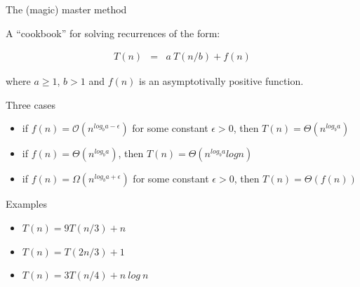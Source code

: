 \begin{frame}{The (magic) master method}

  A ``cookbook'' for solving recurrences of the form:

  \begin{eqnarray*}
    T(n) & = & a\ T(n/b) + f(n)
  \end{eqnarray*}

   where $a \geq 1$, $b > 1$ and $f(n)$ is an asymptotivally positive function.

   \begin{block}{Three cases}
     \begin{scriptsize}
     \begin{itemize}
      \item if $f(n) = \mathcal{O}(n^{log_b a-\epsilon})$ for some constant $\epsilon > 0$\pause, then $T(n) = \Theta(n^{log_b a})$ \pause
      \item if $f(n) = \Theta(n^{log_b a})$\pause, then $T(n) = \Theta(n^{log_b a} log n)$\pause
      \item if $f(n) = \Omega(n^{log_b a + \epsilon})$ for some constant $\epsilon > 0$\pause, then $T(n) = \Theta(f(n))$ 
     \end{itemize}
     \end{scriptsize}
   \end{block}  
  
\end{frame}

\begin{frame}{Examples}

  \begin{itemize}
    \item $T(n) = 9T(n/3) + n$
    \item $T(n) = T(2n/3) + 1$
    \item $T(n) = 3T(n/4) + n\ log\ n$  
  \end{itemize}

\end{frame}
